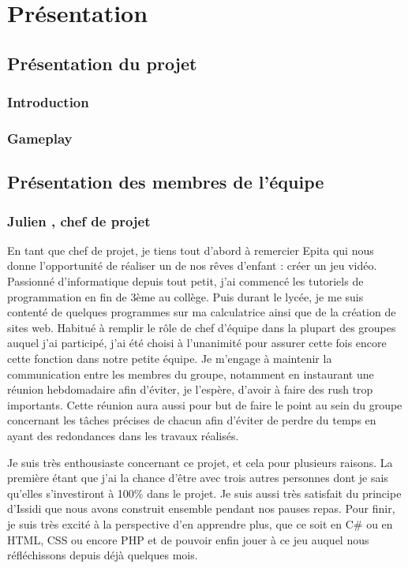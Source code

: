 ﻿\documentclass[12pt]{article}
\begin{document}
\section{Présentation}
\subsection{Présentation du projet}
\subsubsection{Introduction}

\subsubsection{Gameplay}


\subsection{Présentation des membres de l'équipe}
\subsubsection{Julien , chef de projet}
En tant que chef de projet, je tiens tout d'abord à remercier Epita qui nous
donne l'opportunité de réaliser un de nos rêves d'enfant : créer un jeu vidéo.
Passionné d'informatique depuis tout petit, j'ai commencé les tutoriels de
programmation en fin de 3ème au collège. Puis durant le lycée, je me suis contenté
de quelques programmes sur ma calculatrice ainsi que de la création de sites web.
Habitué à remplir le rôle de chef d'équipe dans la plupart des groupes auquel
j'ai participé, j'ai été choisi à l'unanimité pour assurer cette fois encore
cette fonction dans notre petite équipe. Je m'engage à maintenir la communication
entre les membres du groupe, notamment en instaurant une réunion hebdomadaire afin
d'éviter, je l'espère, d'avoir à faire des rush trop importants. Cette réunion aura
aussi pour but de faire le point au sein du groupe concernant les tâches précises 
de chacun afin d'éviter de perdre du temps en ayant des redondances dans les travaux
réalisés.

Je suis très enthousiaste concernant ce projet, et cela pour plusieurs raisons.
La première étant que j'ai la chance d'être avec trois autres personnes dont je sais
qu'elles s'investiront à 100\% dans le projet. Je suis aussi très satisfait du principe
d'Issidi que nous avons construit ensemble pendant nos pauses repas. Pour finir, je
suis très excité à la perspective d'en apprendre plus, que ce soit en C\# ou en HTML,
CSS ou encore PHP et de pouvoir enfin jouer à ce jeu auquel nous réfléchissons depuis
déjà quelques mois.
\end{document}
